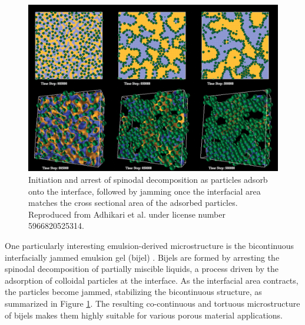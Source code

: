 \begin{figure}
    \centering
    \includegraphics[scale = 0.3]{figures/introduction/bijel_coarsening.jpg}
    \caption{Initiation and arrest of spinodal decomposition as particles adsorb onto the interface, followed by jamming once the 
    interfacial area matches the cross sectional area of the adsorbed particles\cite{stratford_colloidal_2005}. Reproduced from Adhikari et al. 
    under license number 5966820525314.}
    \label{fig:bijel_coarsen}
\end{figure}

One particularly interesting emulsion-derived microstructure is the bicontinuous interfacially jammed emulsion gel (bijel) 
\cite{stratford_colloidal_2005, herzig_bicontinuous_2007, lee_bicontinuous_2010}. Bijels are formed by arresting the spinodal decomposition of partially 
miscible liquids, a process driven by the adsorption of colloidal particles at the interface. As the interfacial area contracts, the particles become 
jammed, stabilizing the bicontinuous structure, as summarized in Figure \ref{fig:bijel_coarsen}. The resulting co-continuous and tortuous microstructure 
of bijels makes them highly suitable for various porous material applications.  

